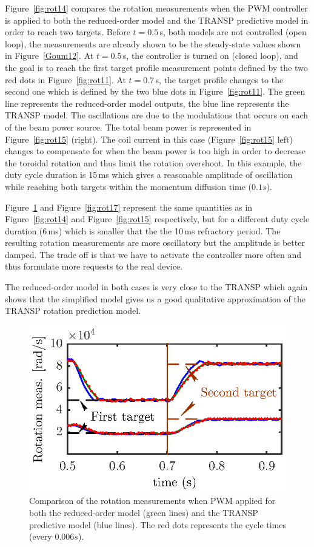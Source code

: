 \documentclass[12pt]{iopart}
\begin{document}
Figure~\ref{fig:rot14} compares the rotation measurements when the PWM controller is applied to both the reduced-order model and the TRANSP predictive model in order to reach two targets.
Before $t=0.5$\,s, both models are not controlled (open loop), the measurements are already shown to be the steady-state values shown in Figure~\ref{Goum12}.
At $t = 0.5$\,s, the controller is turned on (closed loop), and the goal is to reach the first target profile measurement points defined by the two red dots in Figure~\ref{fig:rot11}. At $t = 0.7$\,s, the  target profile changes to the second one which is defined by the two blue dots in Figure~\ref{fig:rot11}.
The green line represents the reduced-order model outputs, the blue line represents the TRANSP model. The oscillations are due to the modulations that occurs on each of the beam power source. The total beam power is represented in Figure~\ref{fig:rot15} (right). The coil current in this case (Figure~\ref{fig:rot15} left) changes to compensate for when the beam power is too high in order to decrease the toroidal rotation and thus limit the rotation overshoot.
In this example, the duty cycle duration is 15\,ms which gives a reasonable amplitude of oscillation while reaching both targets within the momentum diffusion time ($0.1 s$).

Figure~\ref{fig:rot16} and Figure~\ref{fig:rot17} represent the same quantities as in Figure~\ref{fig:rot14} and Figure~\ref{fig:rot15} respectively, but for a different duty cycle duration (6\,ms) which is smaller that the the 10\,ms refractory period.
The resulting rotation measurements are more oscillatory but the amplitude is better damped. The trade off is that we have to activate the controller more often and thus formulate more requests to the real device.

The reduced-order model in both cases is very close to the TRANSP which again shows that the simplified model gives us a good qualitative approximation of the TRANSP rotation prediction model.

\begin{figure}
	\centering
	\includegraphics{imene_figs/fig19} %
	\caption{Comparison of the rotation measurements when PWM applied for both the reduced-order model (green lines) and the TRANSP predictive model (blue lines). The red dots represents the cycle times (every $0.006 s$).}
	\label{fig:rot16}
\end{figure}
\end{document}
